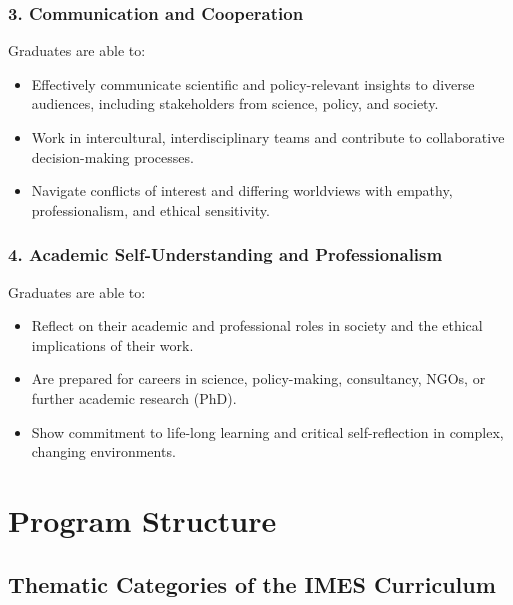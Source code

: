 \documentclass[
  letterpaper,
  10pt,
  openany]{book}
\providecommand{\tightlist}{%
  \setlength{\itemsep}{0pt}\setlength{\parskip}{0pt}}\usepackage{longtable,booktabs,array}
\begin{document}
\subsection*{3. Communication and
Cooperation}\label{communication-and-cooperation}

Graduates are able to:

\begin{itemize}
\tightlist
\item
  Effectively communicate scientific and policy-relevant insights to
  diverse audiences, including stakeholders from science, policy, and
  society.
\item
  Work in intercultural, interdisciplinary teams and contribute to
  collaborative decision-making processes.
\item
  Navigate conflicts of interest and differing worldviews with empathy,
  professionalism, and ethical sensitivity.
\end{itemize}

\subsection*{4. Academic Self-Understanding and
Professionalism}\label{academic-self-understanding-and-professionalism}

Graduates are able to:

\begin{itemize}
\tightlist
\item
  Reflect on their academic and professional roles in society and the
  ethical implications of their work.
\item
  Are prepared for careers in science, policy-making, consultancy, NGOs,
  or further academic research (PhD).
\item
  Show commitment to life-long learning and critical self-reflection in
  complex, changing environments.
\end{itemize}

\chapter*{Program Structure}\label{program-structure}


\section*{Thematic Categories of the IMES
Curriculum}\label{thematic-categories-of-the-imes-curriculum}
\end{document}
